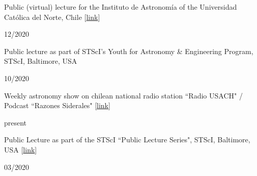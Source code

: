 \documentclass[12pt, a4paper]{article} %
\begin{document}
\begin{minipage}[t]{0.7\textwidth}
\begin{flushleft}%
  \setlength{\leftskip}{0.2cm}%
Public (virtual) lecture for the Instituto de Astronom\'ia of the Universidad Cat\'olica del Norte, Chile [\href{https://fb.watch/2xSnifLOxN/}{link}]
\end{flushleft}
\end{minipage}
\begin{minipage}[t]{0.3\textwidth}
\hfill 12/2020
\end{minipage}

\vspace{0.2cm}

\begin{minipage}[t]{0.7\textwidth}
\begin{flushleft}%
  \setlength{\leftskip}{0.2cm}%
Public lecture as part of STScI’s Youth for Astronomy \& Engineering Program, STScI, Baltimore, USA
\end{flushleft}
\end{minipage}
\begin{minipage}[t]{0.3\textwidth}
\hfill 10/2020
\end{minipage}

\vspace{0.2cm}

\begin{minipage}[t]{0.7\textwidth}
\begin{flushleft}%
  \setlength{\leftskip}{0.2cm}%
Weekly astronomy show on chilean national radio station ``Radio USACH" / Podcast ``Razones Siderales" [\href{https://open.spotify.com/show/6sK0izR6pdByqYPt0uuoal}{link}]
\end{flushleft}
\end{minipage}
\begin{minipage}[t]{0.3\textwidth}
\hfill present
\end{minipage}

\vspace{0.2cm}

\begin{minipage}[t]{0.7\textwidth}
\begin{flushleft}%
  \setlength{\leftskip}{0.2cm}%
Public Lecture as part of the STScI ``Public Lecture Series", STScI, Baltimore, USA [\href{https://www.youtube.com/watch?v=hnAwLra9Kh8&t=1247s}{link}]
\end{flushleft}
\end{minipage}
\begin{minipage}[t]{0.3\textwidth}
\hfill 03/2020
\end{minipage}
\end{document}
